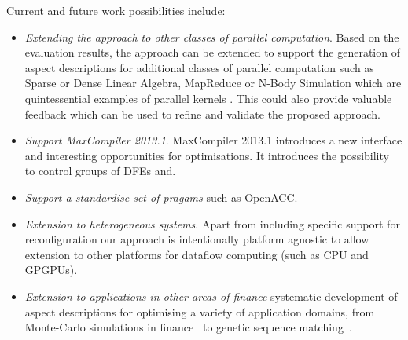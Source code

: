 Current and future work possibilities include:

\begin{itemize}
\item \emph{Extending the approach to other classes of parallel
    computation}.  Based on the evaluation results, the approach can
  be extended to support the generation of aspect descriptions for
  additional classes of parallel computation such as Sparse or Dense
  Linear Algebra, MapReduce or N-Body Simulation which are
  quintessential examples of parallel kernels
  \cite{Asanovic:Bodik:Catanzaro:Gebis:Husbands:Keutzer:Patterson:Plishker:Shalf:Williams:Yelick:2006}. This
  could also provide valuable feedback which can be used to refine and
  validate the proposed approach.

\item \emph{Support MaxCompiler 2013.1}. MaxCompiler 2013.1 introduces
  a new interface and interesting opportunities for optimisations. It
  introduces the possibility to control groups of DFEs and.

\item \emph{Support a standardise set of pragams} such as OpenACC.

\item \emph{Extension to heterogeneous systems}. Apart from including
  specific support for reconfiguration our approach is intentionally
  platform agnostic to allow extension to other platforms for dataflow
  computing (such as CPU and GPGPUs).

\item \emph{Extension to applications in other areas of finance}
  systematic development of aspect descriptions for optimising a
  variety of application domains, from Monte-Carlo simulations in
  finance~\cite{Jin:2012} to genetic sequence
  matching~\cite{Arram:2013}.

\end{itemize}